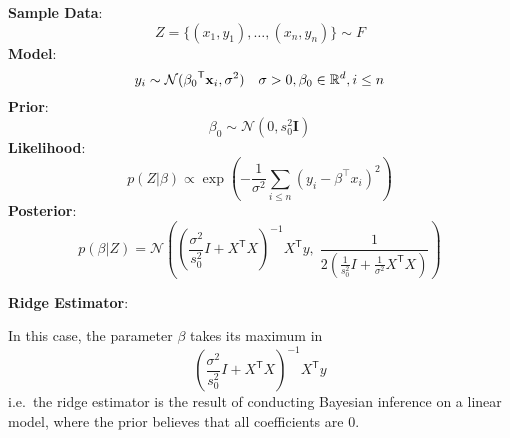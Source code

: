 \begin{examplesection}
    \textbf{Sample Data}:
    \begin{equation*}
        Z=\{(x_1,y_1),\dots,(x_n,y_n)\} \sim F
    \end{equation*}
    \textbf{Model}:
    \noindent\begin{equation*}
        y_i  \sim \mathcal{N}({\beta_0}^{\mathsf{T}}\mathbf{x}_i, \sigma^2)\quad \sigma>0, \beta_0\in \mathbb{R}^d, i\leq n \\
    \end{equation*}
    \textbf{Prior}:
    \noindent\begin{equation*}
        \beta_0\sim\mathcal{N}(0,s_0^2 \mathbf{I}    )
    \end{equation*}
    \textbf{Likelihood}:
    \noindent\begin{equation*}
        p(Z|\beta)\propto\exp\left(-\frac{1}{\sigma^{2}}\sum_{i\leq n}{(y_{i}-\beta^{\top}x_{i})}^{2}\right)
    \end{equation*}
    \textbf{Posterior}:
    \noindent\begin{equation*}
        p(\beta|Z)=\mathcal{N}\left({{\left(\frac{\sigma^{2}}{s_{0}^{2}}I+X^{\mathsf{T}}X\right)}^{-1}X^{\mathsf{T}}y,\;\frac{1}{2({\frac{1}{s_{0}^{2}}I+\frac{1}{\sigma^{2}}X^{\mathsf{T}}X})}}\right)
    \end{equation*}

    \textbf{Ridge Estimator}:

    In this case, the parameter $\beta$ takes its maximum in
    \noindent\begin{equation*}
        {\left(\frac{\sigma^{2}}{s_{0}^{2}}I+X^{\mathsf{T}}X\right)}^{-1}X^{\mathsf{T}}y
    \end{equation*}
    i.e.\ the ridge estimator is the result of conducting Bayesian inference on a linear model, where the prior believes that all coefficients are 0.
\end{examplesection}